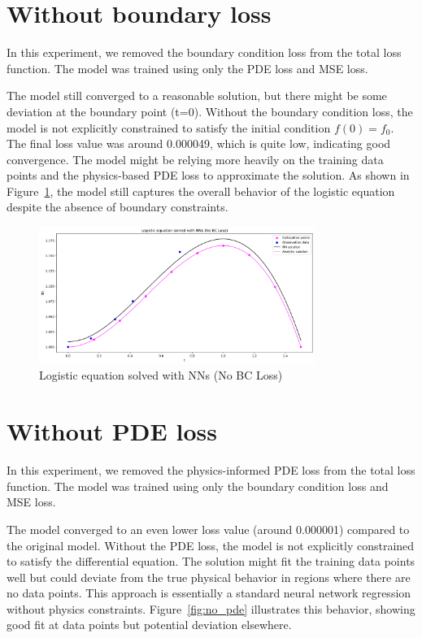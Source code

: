 \documentclass[11pt,a4paper]{article}
\begin{document}
\section{Without boundary loss}
In this experiment, we removed the boundary condition loss from the total loss function. The model was trained using only the PDE loss and MSE loss. 

The model still converged to a reasonable solution, but there might be some deviation at the boundary point (t=0). Without the boundary condition loss, the model is not explicitly constrained to satisfy the initial condition $f(0) = f_0$. The final loss value was around 0.000049, which is quite low, indicating good convergence. The model might be relying more heavily on the training data points and the physics-based PDE loss to approximate the solution. As shown in Figure~\ref{fig:no_bc}, the model still captures the overall behavior of the logistic equation despite the absence of boundary constraints.

\begin{figure}[h]
    \centering
    \includegraphics[width=0.8\textwidth]{figures/pinn_task1_no_bc.png}
    \caption{Logistic equation solved with NNs (No BC Loss)}
    \label{fig:no_bc}
\end{figure}

\section{Without PDE loss}
In this experiment, we removed the physics-informed PDE loss from the total loss function. The model was trained using only the boundary condition loss and MSE loss.

The model converged to an even lower loss value (around 0.000001) compared to the original model. Without the PDE loss, the model is not explicitly constrained to satisfy the differential equation. The solution might fit the training data points well but could deviate from the true physical behavior in regions where there are no data points. This approach is essentially a standard neural network regression without physics constraints. Figure~\ref{fig:no_pde} illustrates this behavior, showing good fit at data points but potential deviation elsewhere.
\end{document}
